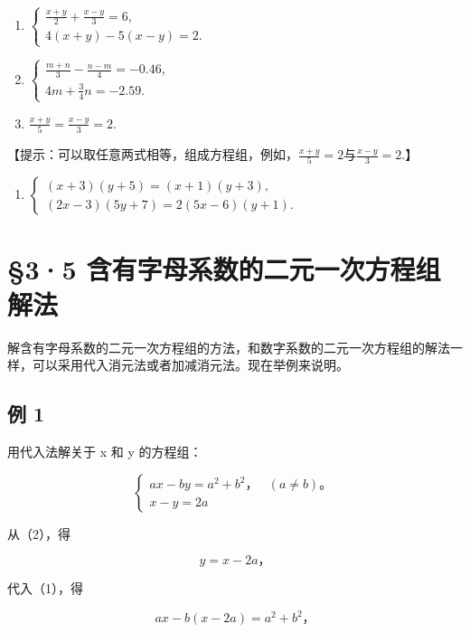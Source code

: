 \begin{enumerate}[start=3]
\item
  \(\left\{ \begin{array}{l} \frac{x + y}{2} + \frac{x - y}{3} = 6, \\ 4(x + y) - 5(x - y) = 2. \end{array} \right.\)
\item
  \(\left\{ \begin{array}{l} \frac{m + n}{3} - \frac{n - m}{4} = -0.46, \\ 4m + \frac{3}{4} n = -2.59. \end{array} \right.\)
\item
  \(\frac{x + y}{5} = \frac{x - y}{3} = 2.\)
\end{enumerate}

【提示：可以取任意两式相等，组成方程组，例如，\(\frac{x+y}{5}=2\)与\(\frac{x-y}{3}=2.\)】

\begin{enumerate}[start=16]
\item
  \(\left\{ \begin{array}{l} (x + 3)(y + 5) = (x + 1)(y + 3), \\ (2x - 3)(5y + 7) = 2(5x - 6)(y + 1). \end{array} \right.\)
\end{enumerate}

\section{§3·5 含有字母系数的二元一次方程组解法}

解含有字母系数的二元一次方程组的方法，和数字系数的二元一次方程组的解法一样，可以采用代入消元法或者加减消元法。现在举例来说明。

\subsection{例 1}

用代入法解关于 x 和 y 的方程组：

\[
\left\{ \begin{array}{ll} a x - b y = a ^ {2} + b ^ {2}\text{，} & (a \neq b)\text{。} \\ x - y = 2 a \end{array} \right. \tag{1}
\]

 从（2），得

\[
y = x - 2 a\text{，} \tag{3}
\]

代入（1），得

\[
a x - b (x - 2 a) = a ^ {2} + b ^ {2}\text{，}
\]

